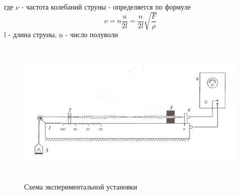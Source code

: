 \documentclass[12pt,a4paper]{article}
\begin{document}
где $\nu$ - частота колебаний струны - определяется по формуле 
\begin{equation}
\nu=n\frac{u}{2l} = \frac{n}{2l}\sqrt{\frac{F}{\rho}}
\end{equation}
l - длина струны, n - число полуволн
\begin{figure}[H]
\centering
\includegraphics[width=14cm, height=7cm]{1.4.5_1}
\caption{Схема экспериментальной установки}
\label{pic:1}
\end{figure}
\end{document}

